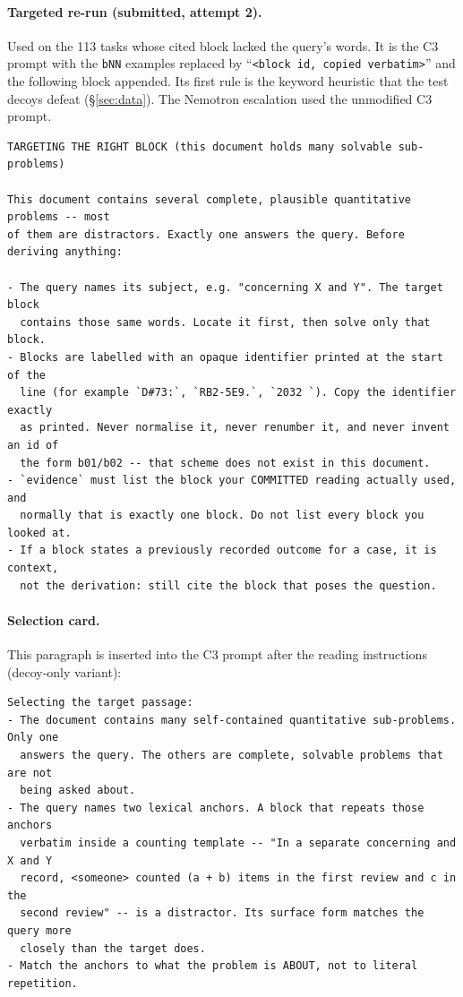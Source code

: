 \documentclass[11pt]{article}%
\begin{document}
\paragraph{Targeted re-run (submitted, attempt 2).} Used on the 113 tasks
whose cited block lacked the query's words. It is the \textsc{C3} prompt with
the \texttt{bNN} examples replaced by ``\texttt{<block id, copied verbatim>}''
and the following block appended. Its first rule is the keyword heuristic that
the test decoys defeat (\S\ref{sec:data}). The Nemotron escalation used the
unmodified \textsc{C3} prompt.
\begin{lstlisting}[style=prompt]
TARGETING THE RIGHT BLOCK (this document holds many solvable sub-problems)

This document contains several complete, plausible quantitative problems -- most
of them are distractors. Exactly one answers the query. Before deriving anything:

- The query names its subject, e.g. "concerning X and Y". The target block
  contains those same words. Locate it first, then solve only that block.
- Blocks are labelled with an opaque identifier printed at the start of the
  line (for example `D#73:`, `RB2-5E9.`, `2032 `). Copy the identifier exactly
  as printed. Never normalise it, never renumber it, and never invent an id of
  the form b01/b02 -- that scheme does not exist in this document.
- `evidence` must list the block your COMMITTED reading actually used, and
  normally that is exactly one block. Do not list every block you looked at.
- If a block states a previously recorded outcome for a case, it is context,
  not the derivation: still cite the block that poses the question.
\end{lstlisting}

\paragraph{Selection card.} This paragraph is inserted into the \textsc{C3}
prompt after the reading instructions (decoy-only variant):
\begin{lstlisting}[style=prompt]
Selecting the target passage:
- The document contains many self-contained quantitative sub-problems. Only one
  answers the query. The others are complete, solvable problems that are not
  being asked about.
- The query names two lexical anchors. A block that repeats those anchors
  verbatim inside a counting template -- "In a separate concerning and X and Y
  record, <someone> counted (a + b) items in the first review and c in the
  second review" -- is a distractor. Its surface form matches the query more
  closely than the target does.
- Match the anchors to what the problem is ABOUT, not to literal repetition.
\end{lstlisting}
\end{document}
